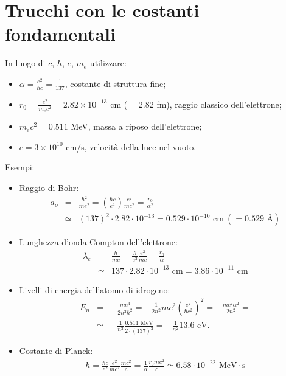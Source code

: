 \documentclass[a4paper,12pt,oneside]{book}
\begin{document}
\section{Trucchi con le costanti fondamentali}
In luogo di $c$, $\hbar$, $e$, $m_e$ utilizzare:
\begin{itemize}
\item $\displaystyle{\alpha =\frac{e^2}{\hbar c}}= \frac{1}{137}$, costante di struttura fine;
\item $\displaystyle{r_0 =\frac{e^2}{m_e c^2}=2.82 \times 10^{-13}}$ cm ($=2.82$ fm), raggio classico dell'elettrone;
\item $\displaystyle{m_ec^2=0.511}$ MeV, massa a riposo dell'elettrone;
\item $\displaystyle{c=3\times 10^{10}}$ cm/s, velocità della luce nel vuoto.
\end{itemize}
Esempi:
\begin{itemize}
\item[ ]Raggio di Bohr:
\begin{eqnarray}
a_o &=&\frac{\hbar ^2}{me^2}=\left( \frac{\hbar c}{e^2}\right)\frac{e ^2}{mc^2}=\frac{r_0}{\alpha ^2} \nonumber \\
&\simeq &(137)^2\cdot 2.82 \cdot 10^{-13}=0.529\cdot10^{-10} \textrm{ cm}\ (=0.529 \textrm{ Å})\nonumber
\end{eqnarray}
\item[ ]Lunghezza d'onda Compton dell'elettrone:
\begin{eqnarray}
\lambda _e &=&\frac{\hbar}{mc}=\frac{\hbar}{e^2}\frac{e^2}{mc}= \frac{r_0}{\alpha}= \nonumber \\
&\simeq & 137\cdot 2.82\cdot 10^{-13} \textrm{ cm}= 3.86 \cdot 10^{-11} \textrm{ cm} \nonumber
\end{eqnarray}
\item[ ]Livelli di energia dell'atomo di idrogeno:
\begin{eqnarray}
E_n &=& -\frac{me^4}{2n^2\hbar^2}=-\frac{1}{2n^2}mc^2 \left(\frac{e^2}{\hbar c^2}\right)^2= -\frac{mc^2 \alpha ^2}{2n^2}= \nonumber \\
&\simeq & -\frac{1}{n^2}\frac{0.511 \textrm{ MeV}}{2\cdot (137)^2}=-\frac{1}{n^2}13.6 \textrm{ eV}. \nonumber
\end{eqnarray}
\item[ ]Costante di Planck:
\begin{eqnarray}
\hbar =\frac{\hbar c}{e^2}\frac{e^2}{mc^2}\frac{mc^2}{c}=\frac{1}{\alpha}\frac{r_0 mc^2}{c}\simeq 6.58\cdot10^{-22} \textrm{ MeV}\cdot \textrm{s} \nonumber 
\end{eqnarray}
\end{itemize}
\end{document}
